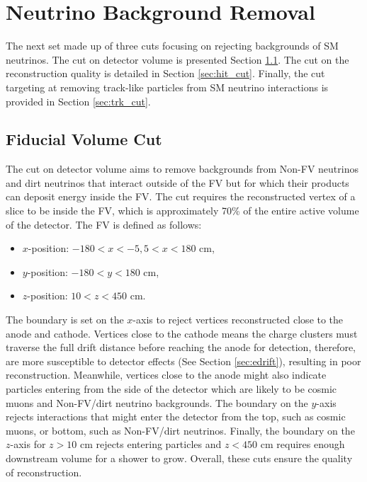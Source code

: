 \section{Neutrino Background Removal}
\label{sec:sm_rej}

The next set made up of three cuts focusing on rejecting backgrounds of SM neutrinos.
The cut on detector volume is presented Section \ref{sec:fv_cut}.
The cut on the reconstruction quality is detailed in Section \ref{sec:hit_cut}.
Finally, the cut targeting at removing track-like particles from SM neutrino interactions is provided in Section \ref{sec:trk_cut}.

\subsection{Fiducial Volume Cut}
\label{sec:fv_cut}

The cut on detector volume aims to remove backgrounds from Non-FV neutrinos and dirt neutrinos that interact outside of the FV but for which their products can deposit energy inside the FV. 
The cut requires the reconstructed vertex of a slice to be inside the FV, which is approximately 70\% of the entire active volume of the detector. 
The FV is defined as follows:
\begin{itemize}
        \item $x$-position: $- 180 < x < -5 , 5 < x < 180$ cm,
        \item $y$-position: $-180 < y < 180$ cm,
        \item $z$-position: $10 < z < 450$ cm.
\end{itemize}
The boundary is set on the $x$-axis to reject vertices reconstructed close to the anode and cathode.
Vertices close to the cathode means the charge clusters must traverse the full drift distance before reaching the anode for detection, therefore, are more susceptible to detector effects (See Section \ref{sec:edrift}), resulting in poor reconstruction.
Meanwhile, vertices close to the anode might also indicate particles entering from the side of the detector which are likely to be cosmic muons and Non-FV/dirt neutrino backgrounds. 
The boundary on the $y$-axis rejects interactions that might enter the detector from the top, such as cosmic muons, or bottom, such as Non-FV/dirt neutrinos.
Finally, the boundary on the $z$-axis for $z > 10$ cm rejects entering particles and $z < 450$ cm requires enough downstream volume for a shower to grow.
Overall, these cuts ensure the quality of reconstruction.

